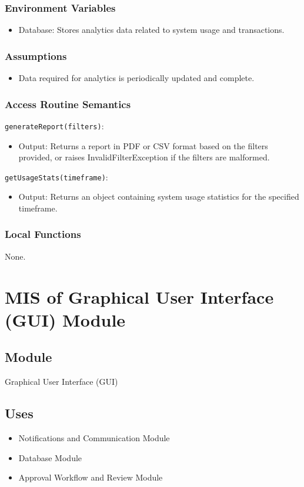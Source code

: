 \documentclass[12pt, titlepage]{article}
\begin{document}
\subsubsection{Environment Variables}
\begin{itemize}
    \item Database: Stores analytics data related to system usage and transactions.
\end{itemize}

\subsubsection{Assumptions}
\begin{itemize}
    \item Data required for analytics is periodically updated and complete.
\end{itemize}

\subsubsection{Access Routine Semantics}
\noindent \texttt{generateReport(filters)}:
\begin{itemize}
    \item Output: Returns a report in PDF or CSV format based on the filters provided, or raises InvalidFilterException if the filters are malformed.
\end{itemize}

\noindent \texttt{getUsageStats(timeframe)}:
\begin{itemize}
    \item Output: Returns an object containing system usage statistics for the specified timeframe.
\end{itemize}

\subsubsection{Local Functions}
None.

\section{MIS of Graphical User Interface (GUI) Module}

\subsection{Module}
Graphical User Interface (GUI)

\subsection{Uses}
\begin{itemize}
    \item Notifications and Communication Module
    \item Database Module
    \item Approval Workflow and Review Module
\end{itemize}
\end{document}
